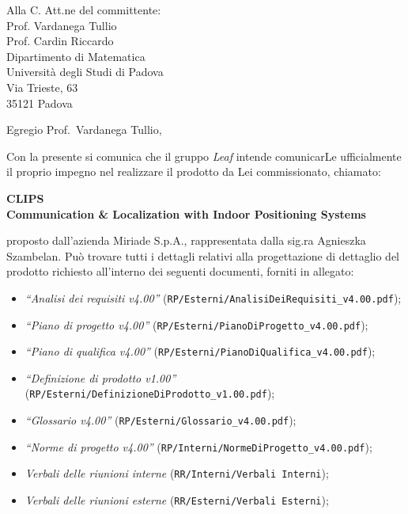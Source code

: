 \documentclass[a4paper,12pt]{letteracdp}
\author{Oscar Elia Conti}
\date{11 aprile 2016}
\begin{document}
	\begin{letter}{
		Alla C. Att.ne del committente: \\
		Prof. Vardanega Tullio \\
		Prof. Cardin Riccardo \\
		Dipartimento di Matematica \\
		Università degli Studi di Padova \\
		Via Trieste, 63 \\
		35121 Padova}
		
		\opening{Egregio Prof.~Vardanega Tullio,}
		Con la presente si comunica che il gruppo \textit{Leaf} intende comunicarLe ufficialmente il proprio impegno nel realizzare il prodotto da Lei commissionato, chiamato:
\begin{center}
	\textbf{CLIPS \\ Communication \& Localization with Indoor Positioning Systems}
\end{center}
proposto dall'azienda Miriade S.p.A., rappresentata dalla sig.ra Agnieszka Szambelan.
Può trovare tutti i dettagli relativi alla progettazione di dettaglio del prodotto richiesto all'interno dei seguenti documenti, forniti in allegato:

\begin{itemize}
	\item \textit{“Analisi dei requisiti v4.00”} (\texttt{RP/Esterni/AnalisiDeiRequisiti\_v4.00.pdf});

	\item \textit{“Piano di progetto v4.00”} (\texttt{RP/Esterni/PianoDiProgetto\_v4.00.pdf});

	\item \textit{“Piano di qualifica v4.00”} (\texttt{RP/Esterni/PianoDiQualifica\_v4.00.pdf});
	
	\item \textit{“Definizione di prodotto v1.00”} (\texttt{RP/Esterni/DefinizioneDiProdotto\_v1.00.pdf});
	
	\item \textit{“Glossario v4.00”} (\texttt{RP/Esterni/Glossario\_v4.00.pdf});
	
	\item \textit{“Norme di progetto v4.00”} (\texttt{RP/Interni/NormeDiProgetto\_v4.00.pdf});

	\item \textit{Verbali delle riunioni interne}	(\texttt{RR/Interni/Verbali Interni});
	
	\item \textit{Verbali delle riunioni esterne}	(\texttt{RR/Esterni/Verbali Esterni});
		

\end{itemize}
\end{letter}
\end{document}
